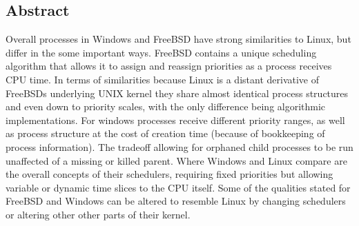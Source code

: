\subsection{Abstract}
Overall processes in Windows and FreeBSD have strong similarities to Linux, but differ in the some important ways. FreeBSD contains a unique scheduling algorithm that allows it to assign and reassign priorities as a process receives CPU time. In terms of similarities because Linux is a distant derivative of FreeBSDs underlying UNIX kernel they share almost identical process structures and even down to priority scales, with the only difference being algorithmic implementations. For windows processes receive different priority ranges, as well as process structure at the cost of creation time (because of bookkeeping of process information). The tradeoff allowing for orphaned child processes to be run unaffected of a missing or killed parent. Where Windows and Linux compare are the overall concepts of their schedulers, requiring fixed priorities but allowing variable or dynamic time slices to the CPU itself. Some of the qualities stated for FreeBSD and Windows can be altered to resemble Linux by changing schedulers or altering other other parts of their kernel.
 